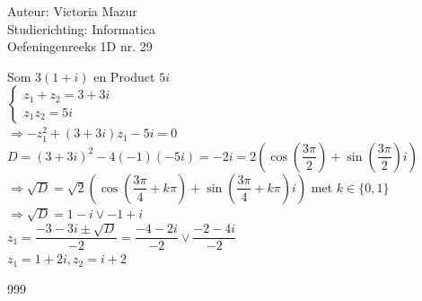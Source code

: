 \documentclass[a4paper]{article}
\begin{document}
  
\noindent \large Auteur: Victoria Mazur \\
\noindent \large Studierichting: Informatica\\
\noindent \large Oefeningenreeks 1D nr. 29\\

\medskip

\normalsize

Som $3(1 + i)$ en Product $5i$ \\

$\left\{
\begin{array}{l}
z_1 + z_2 = 3 + 3i \\
z_1 z_2 = 5i
\end{array}
\right.$ \\

$\Rightarrow -z_1^2 + (3 + 3i)z_1 - 5i = 0$ \\

$D = (3 + 3i)^2 - 4(-1)(-5i) = -2i = 2\left(\cos\left(\dfrac{3\pi}{2}\right) + \sin\left(\dfrac{3\pi}{2}\right)i\right)$ \\

$\Rightarrow \sqrt{D} = \sqrt{2}\left(\cos\left(\dfrac{3\pi}{4} + k\pi\right) + \sin\left(\dfrac{3\pi}{4} + k\pi\right)i\right)$ met $k \in \{0,1\}$ \\

$\Rightarrow \sqrt{D} = 1 - i \vee -1 + i$ \\

$z_1 = \dfrac{-3 - 3i \pm \sqrt{D}}{-2} = \dfrac{-4 - 2i}{-2} \vee \dfrac{-2 - 4i}{-2}$ \\

$z_1 = 1 + 2i, z_2 = i + 2$ \\

\begin{thebibliography}{999}
\end{thebibliography}
\end{document}

